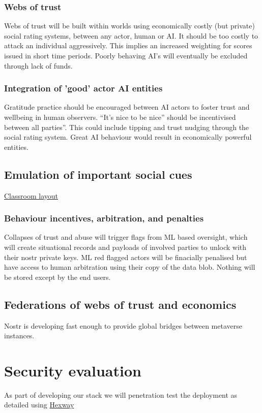 \subsubsection{Webs of trust}
Webs of trust will be built within worlds using economically costly (but private) social rating systems, between any actor, human or AI. It should be too costly to attack an individual aggressively. This implies an increased weighting for scores issued in short time periods. Poorly behaving AI's will eventually be excluded through lack of funds.
\subsubsection{Integration of 'good' actor AI entities}
Gratitude practice should be encouraged between AI actors to foster trust and wellbeing in human observers. ``It's nice to be nice'' should be incentivised between all parties''. This could include tipping and trust nudging through the social rating system. Great AI behaviour would result in economically powerful entities.
\subsection{Emulation of important social cues}
\href{https://www.cleverclassroomsdesign.co.uk/general-5}{Classroom layout}
\subsubsection{Behaviour incentives, arbitration, and penalties}
Collapses of trust and abuse will trigger flags from ML based oversight, which will create situational records and payloads of involved parties to unlock with their nostr private keys. ML red flagged actors will be finacially penalised but have access to human arbitration using their copy of the data blob. Nothing will be stored except by the end users.
\subsection{Federations of webs of trust and economics}
Nostr is developing fast enough to provide global bridges between metaverse instances.
\section{Security evaluation}
As part of developing our stack we will penetration test the deployment as detailed using \href{https://hexway.io/}{Hexway}

